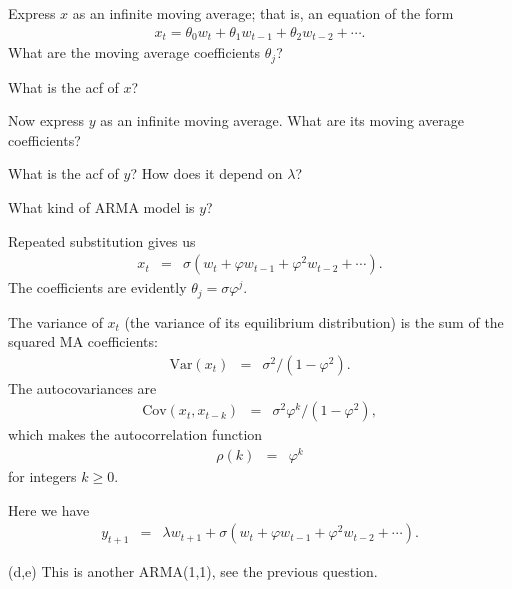 \documentclass[11pt]{exam}
\begin{document}
\begin{questions}
\begin{parts}
\item Express $x$ as an infinite moving average; that is, an equation of the form
\begin{eqnarray*}
    x_t = \theta_0 w_t + \theta_1 w_{t-1} + \theta_2 w_{t-2} + \cdots .
\end{eqnarray*}
What are the moving average coefficients $\theta_j$?
\item What is the acf of $x$?
\item Now express $y$ as an infinite moving average.
What are its moving average coefficients?
\item What is the acf of $y$?  How does it depend on $\lambda$?
\item What kind of ARMA model is $y$?
\end{parts}

\begin{solution}
\begin{parts}
\item Repeated substitution gives us
\begin{eqnarray*}
    x_t &=& \sigma (w_t + \varphi w_{t-1} + \varphi^2 w_{t-2} + \cdots) .
\end{eqnarray*}
The coefficients are evidently $\theta_j = \sigma \varphi^j$.
\item The variance of $x_t$ (the variance of its equilibrium distribution)
is the sum of the squared MA coefficients:
\begin{eqnarray*}
    \mbox{Var}(x_t) &=& \sigma^2 /(1-\varphi^2) .
\end{eqnarray*}
The autocovariances are
\begin{eqnarray*}
    \mbox{Cov}(x_t,x_{t-k}) &=& \sigma^2 \varphi^k /(1-\varphi^2) ,
\end{eqnarray*}
which makes the autocorrelation function
\begin{eqnarray*}
    \rho(k) &=& \varphi^k
\end{eqnarray*}
for integers $k \geq 0$.

\item Here we have
\begin{eqnarray*}
    y_{t+1} &=& \lambda w_{t+1} + \sigma (w_t + \varphi w_{t-1} + \varphi^2 w_{t-2} + \cdots) .
\end{eqnarray*}

\item [(d,e)] This is another ARMA(1,1), see the previous question.

\end{parts}
\end{solution}


\end{questions}
\end{document}
